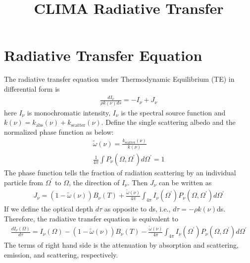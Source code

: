 \documentclass{report}
\title{CLIMA Radiative Transfer}
\author{ }
\newcommand{\PhaseFun}[3]{P_{#1}(#2,#3)}
\newcommand{\OM}{\Omega}
\newcommand{\OMP}{\Omega^{'}}
\newcommand{\SRC}[1]{J_{#1}}
\newcommand{\RAD}[1]{I_{#1}}
\newcommand{\ka}{k_{\mathrm{abs}}}
\newcommand{\ks}{k_{\mathrm{scatter}}}
\newcommand{\SSA}{\tilde{\omega}}          %
\begin{document}
\maketitle
\tableofcontents

\chapter{Radiative Transfer Equation}

The radiative transfer equation under Thermodynamic Equilibrium (TE) in differential form is 
\begin{equation}\begin{aligned}
   \frac{d\RAD{\nu}}{\rho k(\nu) ds} = -\RAD{\nu} + \SRC{\nu}
\end{aligned}
\end{equation}
here $\RAD{\nu}$ is monochromatic intensity, $\RAD{\nu}$ is the spectral source function and $k(\nu) = \ka(\nu) + \ks(\nu)$. Define the single scattering albedo and the normalized phase function as below:
\begin{align}
\SSA(\nu) = \frac{\ks(\nu)}{k(\nu)}\\
\frac{1}{4\pi}\int \PhaseFun{\nu}{\OM}{\OMP} d\OMP=1
\end{align}
The phase function tells the fraction of radiation scattering by an individual particle from $\OMP$ to $\OM$, the direction of $\RAD{\nu}$. Then $\SRC{\nu}$ can be written as 
\begin{align}
    \SRC{\nu} = (1-\SSA(\nu)) B_{\nu}(T) + \frac{\SSA(\nu)}{4\pi}\int_{4\pi} \RAD{\nu}(\OMP)\PhaseFun{\nu}{\OM}{\OMP}d\OMP
\end{align}
If we define the optical depth $d\tau$ as opposite to ds, i.e., $d\tau = -\rho k(\nu)$ds. Therefore, the radiative transfer equation is equivalent to 
\begin{align}
    \frac{d\RAD{\nu}(\OM)}{d\tau} = \RAD{\nu}(\OM) - (1-\SSA(\nu))B_{\nu}(T) - \frac{\SSA(\nu)}{4\pi}\int_{4\pi} \RAD{\nu}(\OMP)\PhaseFun{\nu}{\OM}{\OMP}d\OMP
\end{align}
The terms of right hand side is the attenuation by absorption and scattering, emission, and scattering, respectively. 


\end{document}

